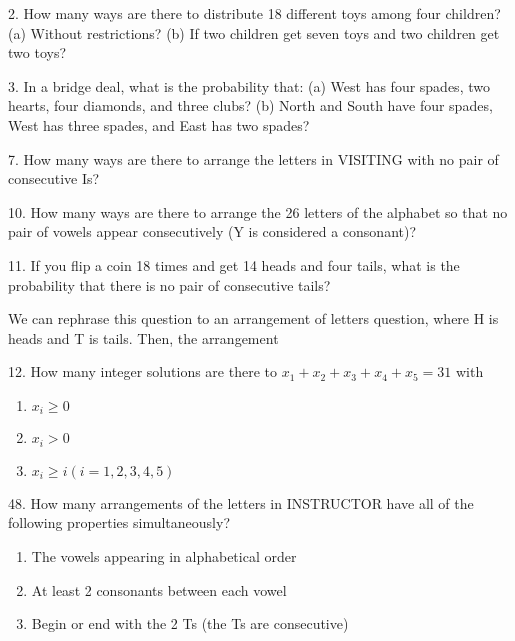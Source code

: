\documentclass[12pt]{article}
\begin{document}
2. How many ways are there to distribute 18 different toys among four children?
(a) Without restrictions?
(b) If two children get seven toys and two children get two toys?
\begin{solution}
    
\end{solution}
3. In a bridge deal, what is the probability that:
(a) West has four spades, two hearts, four diamonds, and three clubs?
(b) North and South have four spades, West has three spades, and East has two
spades?
\begin{solution}
    
\end{solution}
7. How many ways are there to arrange the letters in VISITING with no pair of
consecutive Is?
\begin{solution}
    
\end{solution}
10. How many ways are there to arrange the 26 letters of the alphabet so that no pair
of vowels appear consecutively (Y is considered a consonant)?
\begin{solution}
    
\end{solution}
11. If you flip a coin 18 times and get 14 heads and four tails, what is the probability
that there is no pair of consecutive tails?
\begin{solution}
    We can rephrase this question to an arrangement of letters question, 
    where H is heads and T is tails. Then, the arrangement 
\end{solution}
12. How many integer solutions are there to $x_1 + x_2 + x_3 + x_4 + x_5 
= 31$ with 
\begin{enumerate}[label=(\alph*)]
    \item $x_i \ge 0$ 
    \item $x_i > 0$ 
    \item $x_i \ge i(i = 1, 2, 3, 4, 5)$
\end{enumerate}
\begin{solution}
    
\end{solution}
48. How many arrangements of the letters in INSTRUCTOR have all of the
following properties simultaneously?
\begin{enumerate}[label=(\alph*)]
    \item The vowels appearing in alphabetical order
    \item At least 2 consonants between each vowel
    \item Begin or end with the 2 Ts (the Ts are consecutive)
\end{enumerate}
\end{document}
